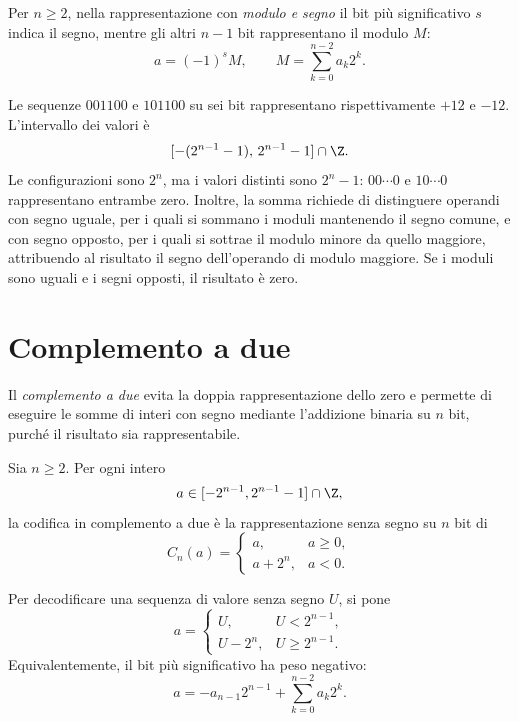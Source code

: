 \begin{definition}
Per \(n\ge2\), nella rappresentazione con \emph{modulo e segno} il bit
più significativo \(s\) indica il segno, mentre gli altri \(n-1\) bit
rappresentano il modulo \(M\):
\[
  a=(-1)^sM,\qquad
  M=\sum_{k=0}^{n-2}a_k2^k.
\]
\end{definition}

Le sequenze \(001100\) e \(101100\) su sei bit rappresentano
rispettivamente \(+12\) e \(-12\). L'intervallo dei valori è
\[
  [-(2^{n-1}-1),\,2^{n-1}-1]\cap\Z.
\]
Le configurazioni sono \(2^n\), ma i valori distinti sono \(2^n-1\):
\(00\cdots0\) e \(10\cdots0\) rappresentano entrambe zero.
Inoltre, la somma richiede di distinguere operandi con segno uguale,
per i quali si sommano i moduli mantenendo il segno comune, e con
segno opposto, per i quali si sottrae il modulo minore da quello
maggiore, attribuendo al risultato il segno dell'operando di
modulo maggiore. Se i moduli sono uguali e i segni opposti,
il risultato è zero.

\section{Complemento a due}
\label{sec:fi-complemento-due}

Il \emph{complemento a due} evita la doppia rappresentazione dello zero
e permette di eseguire le somme di interi con segno mediante
l'addizione binaria su \(n\) bit, purché il risultato sia rappresentabile.

\begin{definition}
\label{def:fi-complemento-due}
Sia \(n\ge2\). Per ogni intero
\[
  a\in[-2^{n-1},2^{n-1}-1]\cap\Z,
\]
la codifica in complemento a due è la rappresentazione senza segno
su \(n\) bit di
\[
  C_n(a)=
  \begin{cases}
    a, & a\ge0,\\
    a+2^n, & a<0.
  \end{cases}
\]
\end{definition}

Per decodificare una sequenza di valore senza segno \(U\), si pone
\[
  a=\begin{cases}
    U, & U<2^{n-1},\\
    U-2^n, & U\ge2^{n-1}.
  \end{cases}
\]
Equivalentemente, il bit più significativo ha peso negativo:
\begin{equation}
  a=-a_{n-1}2^{n-1}+\sum_{k=0}^{n-2}a_k2^k.
  \label{eq:fi-pesi-complemento-due}
\end{equation}

